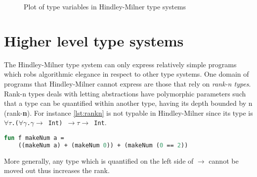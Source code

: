 \documentclass[11pt,oneside,a4paper]{report}
\begin{document}
\begin{figure}[ht]
    \centering
{}
    \caption{Plot of type variables in Hindley-Milner type systems}
    \label{fig:expplot}
\end{figure}

\section{Higher level type systems}
The Hindley-Milner type system can only express relatively simple programs which robs algorithmic elegance in respect to other type systems.
One domain of programs that Hindley-Milner cannot express are those that rely on \textit{rank-n types}.
Rank-n types deals with letting abstractions have polymorphic parameters such that a type can be quantified within another type, having its depth bounded by n (rank-\textbf{n}).
For instance \autoref{lst:rankn} is not typable in Hindley-Milner since its type is \texttt{$\forall\tau$.($\forall\gamma$.$\gamma \rightarrow$ Int) $\rightarrow \tau \rightarrow$ Int}.
\begin{lstlisting}[language=ML,caption={Program that requires rank-n types},label={lst:rankn},mathescape=true]
fun f makeNum a =
    ((makeNum a) + (makeNum 0)) + (makeNum (0 == 2))
\end{lstlisting}
More generally, any type which is quantified on the left side of $\rightarrow$ cannot be moved out thus increases the rank.
\end{document}
